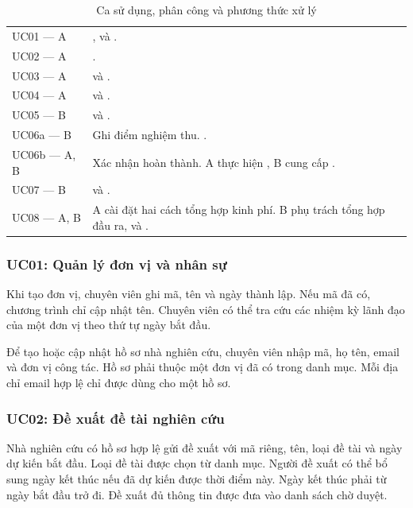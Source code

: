 \begin{table}[!htbp]
\caption{Ca sử dụng, phân công và phương thức xử lý}\label{tab:uc}
\small\singlespacing
\begin{tabularx}{\linewidth}{@{}lL@{}}\toprule
UC01 — A & ,  và . \\
UC02 — A & . \\
UC03 — A &  và . \\
UC04 — A &  và . \\
UC05 — B &  và . \\
UC06a — B & Ghi điểm nghiệm thu. . \\
UC06b — A, B & Xác nhận hoàn thành. A thực hiện , B cung cấp . \\
UC07 — B &  và . \\
UC08 — A, B & A cài đặt hai cách tổng hợp kinh phí. B phụ trách tổng hợp đầu ra,  và . \\
\bottomrule\end{tabularx}
\end{table}

\subsubsection{UC01: Quản lý đơn vị và nhân sự}

Khi tạo đơn vị, chuyên viên ghi mã, tên và ngày thành lập. Nếu mã đã có, chương trình chỉ cập nhật tên. Chuyên viên có thể tra cứu các nhiệm kỳ lãnh đạo của một đơn vị theo thứ tự ngày bắt đầu.

Để tạo hoặc cập nhật hồ sơ nhà nghiên cứu, chuyên viên nhập mã, họ tên, email và đơn vị công tác. Hồ sơ phải thuộc một đơn vị đã có trong danh mục. Mỗi địa chỉ email hợp lệ chỉ được dùng cho một hồ sơ.

\subsubsection{UC02: Đề xuất đề tài nghiên cứu}

Nhà nghiên cứu có hồ sơ hợp lệ gửi đề xuất với mã riêng, tên, loại đề tài và ngày dự kiến bắt đầu. Loại đề tài được chọn từ danh mục. Người đề xuất có thể bổ sung ngày kết thúc nếu đã dự kiến được thời điểm này. Ngày kết thúc phải từ ngày bắt đầu trở đi. Đề xuất đủ thông tin được đưa vào danh sách chờ duyệt.


